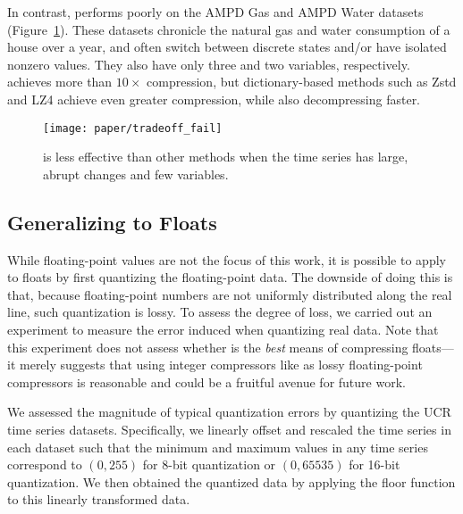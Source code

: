 In contrast, \minesp performs poorly on the AMPD Gas and AMPD Water datasets (Figure~\ref{fig:tradeoff_failure}). These datasets chronicle the natural gas and water consumption of a house over a year, and often switch between discrete states and/or have isolated nonzero values. They also have only three and two variables, respectively. \minesp achieves more than $10\times$ compression, but dictionary-based methods such as Zstd and LZ4 achieve even greater compression, while also decompressing faster.

\begin{figure}[h]
\begin{center}
    \texttt{[image: paper/tradeoff\_fail]}
    \caption{\minesp is less effective than other methods when the time series has large, abrupt changes and few variables.}
    \label{fig:tradeoff_failure}
\end{center}
\end{figure}

\subsection{Generalizing to Floats} \label{sec:floats}

While floating-point values are not the focus of this work, it is possible to apply \minesp to floats by first quantizing the floating-point data. The downside of doing this is that, because floating-point numbers are not uniformly distributed along the real line, such quantization is lossy. To assess the degree of loss, we carried out an experiment to measure the error induced when quantizing real data. Note that this experiment does not assess whether \minesp is the \textit{best} means of compressing floats---it merely suggests that using integer compressors like \minesp as lossy floating-point compressors is reasonable and could be a fruitful avenue for future work. %

We assessed the magnitude of typical quantization errors by quantizing the UCR time series datasets. Specifically, we linearly offset and rescaled the time series in each dataset such that the minimum and maximum values in any time series correspond to $(0, 255)$ for 8-bit quantization or $(0, 65535)$ for 16-bit quantization. We then obtained the quantized data by applying the floor function to this linearly transformed data.

